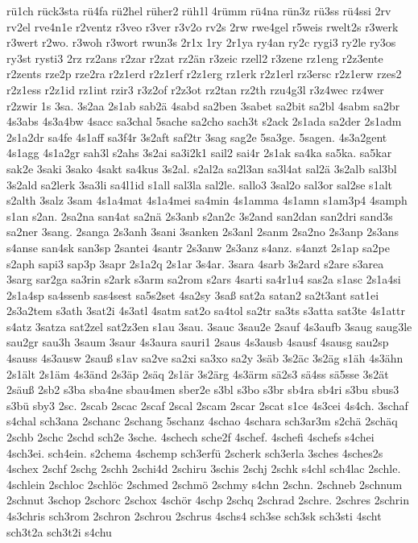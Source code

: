 {rü1ch
rück3sta
rü4fa
rü2hel
rüher2
rüh1l
4rümm
rü4na
rün3z
rü3ss
rü4ssi
2rv
rv2el
rve4n1e
r2ventz
r3veo
r3ver
r3v2o
rv2s
2rw
rwe4gel
r5weis
rwelt2s
r3werk
r3wert
r2wo.
r3woh
r3wort
rwun3s
2r1x
1ry
2r1ya
ry4an
ry2c
rygi3
ry2le
ry3os
ry3st
rysti3
2rz
rz2ans
r2zar
r2zat
rz2än
r3zeic
rzell2
r3zene
rz1eng
r2z3ente
r2zents
rze2p
rze2ra
r2z1erd
r2z1erf
r2z1erg
rz1erk
r2z1erl
rz3ersc
r2z1erw
rzes2
r2z1ess
r2z1id
rz1int
rzir3
r3z2of
r2z3ot
rz2tan
rz2th
rzu4g3l
r3z4wec
rz4wer
r2zwir
1s
3sa.
3s2aa
2s1ab
sab2ä
4sabd
sa2ben
3sabet
sa2bit
sa2bl
4sabm
sa2br
4s3abs
4s3a4bw
4sacc
sa3chal
5sache
sa2cho
sach3t
s2ack
2s1ada
sa2der
2s1adm
2s1a2dr
sa4fe
4s1aff
sa3f4r
3s2aft
saf2tr
3sag
sag2e
5sa3ge.
5sagen.
4s3a2gent
4s1agg
4s1a2gr
sah3l
s2ahs
3s2ai
sa3i2k1
sail2
sai4r
2s1ak
sa4ka
sa5ka.
sa5kar
sak2e
3saki
3sako
4sakt
sa4kus
3s2al.
s2al2a
sa2l3an
sa3l4at
sal2ä
3s2alb
sal3bl
3s2ald
sa2lerk
3sa3li
sa4l1id
s1all
sal3la
sal2le.
sallo3
3sal2o
sal3or
sal2se
s1alt
s2alth
3salz
3sam
4s1a4mat
4s1a4mei
sa4min
4s1amma
4s1amn
s1am3p4
4samph
s1an
s2an.
2sa2na
san4at
sa2nä
2s3anb
s2an2c
3s2and
san2dan
san2dri
sand3s
sa2ner
3sang.
2sanga
2s3anh
3sani
3sanken
2s3anl
2sanm
2sa2no
2s3anp
2s3ans
s4anse
san4sk
san3sp
2santei
4santr
2s3anw
2s3anz
s4anz.
s4anzt
2s1ap
sa2pe
s2aph
sapi3
sap3p
3sapr
2s1a2q
2s1ar
3s4ar.
3sara
4sarb
3s2ard
s2are
s3area
3sarg
sar2ga
sa3rin
s2ark
s3arm
sa2rom
s2ars
4sarti
sa4r1u4
sas2a
s1asc
2s1a4si
2s1a4sp
sa4ssenb
sas4sest
sa5s2set
4sa2sy
3saß
sat2a
satan2
sa2t3ant
sat1ei
2s3a2tem
s3ath
3sat2i
4s3atl
4satm
sat2o
sa4tol
sa2tr
sa3ts
s3atta
sat3te
4s1attr
s4atz
3satza
sat2zel
sat2z3en
s1au
3sau.
3sauc
3sau2e
2sauf
4s3aufb
3saug
saug3le
sau2gr
sau3h
3saum
3saur
4s3aura
sauri1
2saus
4s3ausb
4sausf
4sausg
sau2sp
4sauss
4s3ausw
2sauß
s1av
sa2ve
sa2xi
sa3xo
sa2y
3säb
3s2äc
3s2äg
s1äh
4s3ähn
2s1ält
2s1äm
4s3änd
2s3äp
2säq
2s1är
3s2ärg
4s3ärm
sä2s3
sä4ss
sä5sse
3s2ät
2säuß
2sb2
s3ba
sba4ne
sbau4men
sber2e
s3bl
s3bo
s3br
sb4ra
sb4ri
s3bu
sbus3
s3bü
sby3
2sc.
2scab
2scac
2scaf
2scal
2scam
2scar
2scat
s1ce
4s3cei
4s4ch.
3schaf
s4chal
sch3ana
2schanc
2schang
5schanz
4schao
4schara
sch3ar3m
s2chä
2schäq
2schb
2schc
2schd
sch2e
3sche.
4schech
sche2f
4schef.
4schefi
4schefs
s4chei
4sch3ei.
sch4ein.
s2chema
4schemp
sch3erfü
2scherk
sch3erla
3sches
4sches2s
4schex
2schf
2schg
2schh
2schi4d
2schiru
3schis
2schj
2schk
s4chl
sch4lac
2schle.
4schlein
2schloc
2schlöc
2schmed
2schmö
2schmy
s4chn
2schn.
2schneb
2schnum
2schnut
3schop
2schorc
2schox
4schör
4schp
2schq
2schrad
2schre.
2schres
2schrin
4s3chris
sch3rom
2schron
2schrou
2schrus
4schs4
sch3se
sch3sk
sch3sti
4scht
sch3t2a
sch3t2i
s4chu
}
